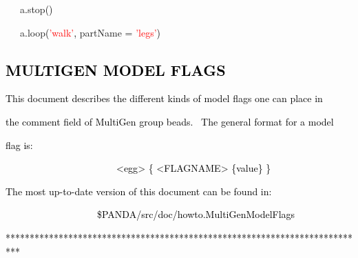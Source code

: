 \documentclass[a4paper]{article}
\newcommand\textstyleOOoComputerKeyWord[1]{\textrm{\textcolor[rgb]{0.0,0.0,0.5019608}{#1}}}
\newcommand\textstyleOOoComputerIdent[1]{\textrm{\textcolor[rgb]{0.0,0.5019608,0.0}{#1}}}
\newcommand\textstyleOOoComputerBase[1]{\textrm{\textcolor{black}{#1}}}
\newcommand\textstyleOOoComputerLiteral[1]{\textrm{\textcolor{red}{#1}}}
\begin{document}
\bigskip

{\color{black}
\textstyleOOoComputerKeyWord{\textcolor{black}{\ \ \ }}\textstyleOOoComputerIdent{a}\textstyleOOoComputerBase{.}\textstyleOOoComputerIdent{stop}\textstyleOOoComputerBase{()}}

{\color{black}
\textstyleOOoComputerKeyWord{\textcolor{black}{\ \ \ }}\textstyleOOoComputerIdent{a}\textstyleOOoComputerBase{.}\textstyleOOoComputerIdent{loop}\textstyleOOoComputerBase{(}\textstyleOOoComputerLiteral{{}'walk'}\textstyleOOoComputerBase{,}\textstyleOOoComputerKeyWord{\textcolor{black}{
}}\textstyleOOoComputerIdent{partName}\textstyleOOoComputerKeyWord{\textcolor{black}{
}}\textstyleOOoComputerBase{=}\textstyleOOoComputerKeyWord{\textcolor{black}{
}}\textstyleOOoComputerLiteral{{}'legs'}\textstyleOOoComputerBase{)}}


\bigskip

\clearpage\subsection[MULTIGEN MODEL FLAGS]{\textstyleOOoComputerKeyWord{\textcolor{black}{MULTIGEN MODEL FLAGS}}}
\hypertarget{RefHeading7908869075401}{}{\color{black}
\textstyleOOoComputerKeyWord{\textcolor{black}{This document describes the different kinds of model flags one can place
in}}}

{\color{black}
\textstyleOOoComputerKeyWord{\textcolor{black}{the comment field of MultiGen group beads. \ The general format for a
model}}}

{\color{black}
\textstyleOOoComputerKeyWord{\textcolor{black}{flag is: }}}

{\color{black}
\textstyleOOoComputerKeyWord{\textcolor{black}{\ \ \ \ \ \ \ \ \ \ \ \ \ \ \ \ \ \ \ \ \ \ \ {\textless}egg{\textgreater}
\{ {\textless}FLAGNAME{\textgreater} \{value\} \}}}}


\bigskip

{\color{black}
\textstyleOOoComputerKeyWord{\textcolor{black}{The most up-to-date version of this document can be found in:}}}


\bigskip

{\color{black}
\textstyleOOoComputerKeyWord{\textcolor{black}{\ \ \ \ \ \ \ \ \ \ \ \ \ \ \ \ \ \ \ \$PANDA/src/doc/howto.MultiGenModelFlags}}}


\bigskip

{\color{black}
\textstyleOOoComputerKeyWord{\textcolor{black}{***************************************************************************}}}
\end{document}
